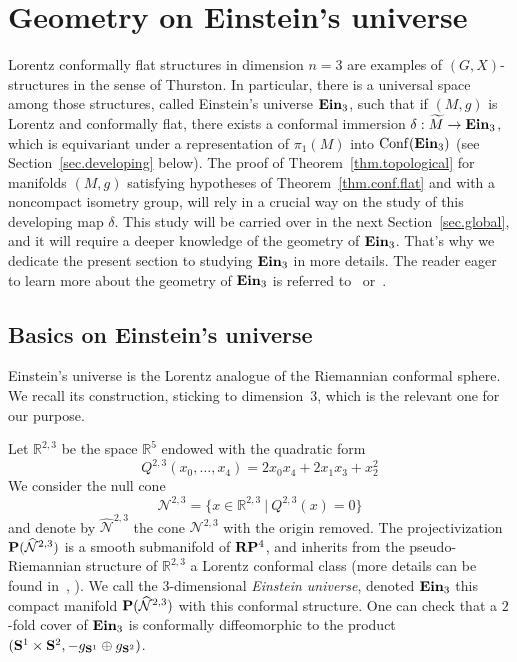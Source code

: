 \documentclass[11pt]{article}
\theoremstyle{definition}
\numberwithin{equation}{section}
\numberwithin{figure}{section}
\numberwithin{table}{section}
\DeclareMathOperator{\Conf}{Conf}
\DeclareMathOperator{\ein}{{\bf Ein}_3}
\newcommand*\RR{\mathbb{R}}
\newcommand{\R}{{\bf R}}
\newcommand{\BP}{{\bf P}}
\let\oldtilde\tilde
\renewcommand*\tilde[1]{\mathchoice{\widetilde{#1}}{\widetilde{#1}}{\widetilde{#1}}{\oldtilde{#1}}}
\begin{document}
\section{Geometry on Einstein's universe}\label{sec.geomeinstein}

Lorentz conformally flat structures in dimension $n=3$ are examples of $(G,X)$-structures in the sense of Thurston. In particular, there is a universal space among those structures, called Einstein's universe $\ein$, such that if $(M,g)$ is Lorentz and conformally flat, there exists a conformal immersion $\delta: \tilde{M} \to \ein$, which is equivariant under a representation of $\pi_1(M)$ into $\Conf(\ein)$ (see Section~\ref{sec.developing} below). The proof of Theorem~\ref{thm.topological} for manifolds $(M,g)$ satisfying hypotheses of Theorem~\ref{thm.conf.flat} and with a noncompact isometry group, will rely in a crucial way on the study of this developing map $\delta$. This study will be carried over in the next Section~\ref{sec.global}, and it will require a deeper knowledge of the geometry of $\ein$. That's why we dedicate the present section to studying $\ein$ in more details. The reader eager to learn more about the geometry of $\ein$ is referred to~\cite{charlesthese} or~\cite{primer}.


\subsection{Basics on Einstein's universe}\label{sec.description.einstein}
Einstein's universe is the Lorentz analogue of the Riemannian conformal sphere. We recall its construction, sticking to dimension~$3$, which is the relevant one for our purpose.

Let $\RR^{2,3}$ be the space $\RR^{5}$ endowed with the quadratic form
\[
Q^{2,3}(x_0, \ldots, x_{4}) = 2x_0x_{4} + 2x_{1}x_{3} + x_2^2
\]
We consider the null cone
\[
\mathcal{N}^{2,3} = \{ x \in \RR^{2,3} \ | \ Q^{2,3}(x)=0 \}
\]
and denote by $\mathcal{\widehat{N}}^{2,3}$ the cone $\mathcal{N}^{2,3}$ with the origin removed. The projectivization ${\BP}(\widehat{\mathcal{N}}^{2,3})$ is a smooth submanifold of $\R\BP^{4}$, and inherits from the pseudo-Riemannian structure of $\RR^{2,3}$ a Lorentz conformal class (more details can be found in~\cite{charlesthese}, \cite{primer}). We call the $3$-dimensional \emph{Einstein universe}, denoted $\ein$ this compact manifold ${\BP}(\widehat{\mathcal{N}}^{2,3})$ with this conformal structure. One can check that a $2$-fold cover of $\ein$ is conformally diffeomorphic to the product $({\bf S}^1 \times {\bf S}^{2},-g_{{\bf S}^1} \oplus g_{{\bf S}^2})$.
\end{document}
